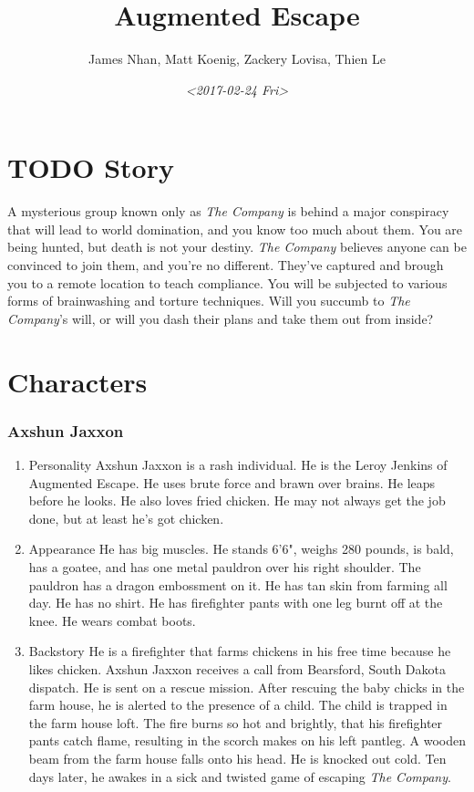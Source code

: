 \documentclass[11pt]{article}
\author{James Nhan, Matt Koenig, Zackery Lovisa, Thien Le}
\date{\textit{<2017-02-24 Fri>}}
\title{Augmented Escape}
\begin{document}
\maketitle
\pagebreak

\section{{\bfseries\sffamily TODO} Story}
\label{sec:org0c412ad}
A mysterious group known only as \emph{The Company} is behind a major conspiracy that will lead to world domination, and you know too much about them. You are being hunted, but death is not your destiny. \emph{The Company} believes anyone can be convinced to join them, and you're no different. They've captured and brough you to a remote location to teach compliance. You will be subjected to various forms of brainwashing and torture techniques. Will you succumb to \emph{The Company}'s will, or will you dash their plans and take them out from inside?

\section{Characters}
\label{sec:org199a281}
\subsubsection{Axshun Jaxxon}
\label{sec:org7d84e9c}

\begin{enumerate}
\item Personality
\label{sec:org7c60101}
Axshun Jaxxon is a rash individual. He is the Leroy Jenkins of Augmented Escape. He uses brute force and brawn over brains. He leaps before he looks. He also loves fried chicken. He may not always get the job done, but at least he's got chicken.

\item Appearance
\label{sec:org54ca9d0}
He has big muscles. He stands 6'6", weighs 280 pounds, is bald, has a goatee, and has one metal pauldron over his right shoulder. The pauldron has a dragon embossment on it. He has tan skin from farming all day. He has no shirt. He has firefighter pants with one leg burnt off at the knee. He wears combat boots.

\item Backstory
\label{sec:orga2a1b95}
He is a firefighter that farms chickens in his free time because he likes chicken. Axshun Jaxxon receives a call from Bearsford, South Dakota dispatch. He is sent on a rescue mission. After rescuing the baby chicks in the farm house, he is alerted to the presence of a child. The child is trapped in the farm house loft. The fire burns so hot and brightly, that his firefighter pants catch flame, resulting in the scorch makes on his left pantleg. A wooden beam from the farm house falls onto his head. He is knocked out cold. Ten days later, he awakes in a sick and twisted game of escaping \emph{The Company}.
\end{enumerate}
\end{document}
